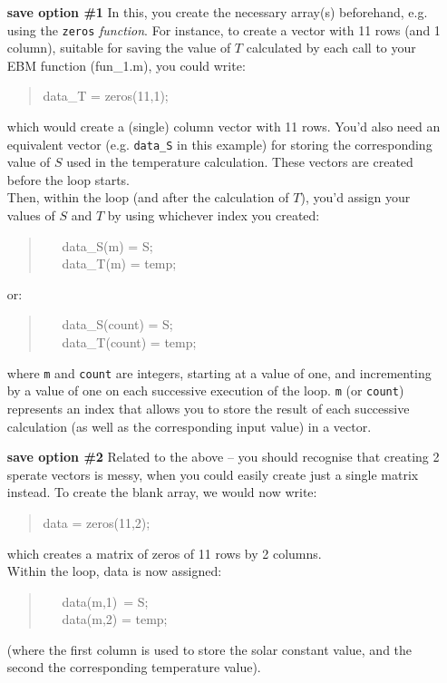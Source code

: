 \documentclass{tufte-book} %
\newenvironment{docspec}{\begin{quotation}\ttfamily\parskip0pt\parindent0pt\ignorespaces}{\end{quotation}}
\begin{document}
\begin{enumerate}
\setlength{\itemindent}{.65in}

\item [\textbf{save option \#1}] In this, you create the necessary array(s) beforehand, e.g. using the \texttt{zeros} \textit{function}. For instance, to create a vector with 11 rows (and 1 column), suitable for saving the value of \(T\) calculated by each call to your EBM function (\textsf{fun\_1.m}), you could write:
\begin{docspec}
data\_T = zeros(11,1);
\end{docspec}
which would create a (single) column vector with 11 rows. You'd also need an equivalent vector (e.g. \texttt{data\_S} in this example) for storing the corresponding value of \(S\) used in the temperature calculation. These vectors are created before the loop starts.
\\Then, within the loop (and after the calculation of \(T\)), you'd assign your values of \(S\) and \(T\) by using whichever index you created:
\begin{docspec}
\ \ \ data\_S(m) = S;
\\ \ \ \ data\_T(m) = temp;
\end{docspec}
or:
\begin{docspec}
\ \ \ data\_S(count) = S;
\\ \ \ \ data\_T(count) = temp;
\end{docspec}
where \texttt{m} and \texttt{count} are integers, starting at a value of one, and incrementing by a value of one on each successive execution of the loop. \texttt{m} (or \texttt{count}) represents an index that allows you to store the result of each successive calculation  (as well as the corresponding input value) in a vector.

\item [\textbf{save option \#2}] Related to the above -- you should recognise that creating 2 sperate vectors is messy, when you could easily create just a single matrix instead. To create the blank array, we would now write:
\begin{docspec}
data = zeros(11,2);
\end{docspec}
which creates a matrix of zeros of 11 rows by 2 columns.
\\\noindent Within the loop, data is now assigned:
\begin{docspec}
\ \ \ data(m,1)\ = S;
\\ \ \ \ data(m,2) = temp;
\end{docspec}
(where the first column is used to store the solar constant value, and the second the corresponding temperature value).


\end{enumerate}
\end{document}
